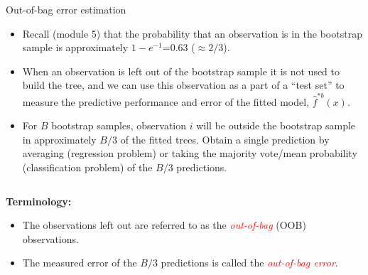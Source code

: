 \documentclass[
  10pt,
  ignorenonframetext,
]{beamer}
\providecommand{\tightlist}{%
  \setlength{\itemsep}{0pt}\setlength{\parskip}{0pt}}
\begin{document}
\begin{frame}
\begin{block}{Out-of-bag error estimation}
\protect\hypertarget{out-of-bag-error-estimation}{}
\(~\)

\begin{itemize}
\tightlist
\item
  Recall (module 5) that the probability that an observation is in the
  bootstrap sample is approximately \(1-e^{-1}\)=0.63 (\(\approx 2/3\)).
\end{itemize}

\vspace{1mm}

\begin{itemize}
\tightlist
\item
  When an observation is left out of the bootstrap sample it is not used
  to build the tree, and we can use this observation as a part of a
  ``test set'' to measure the predictive performance and error of the
  fitted model, \(\hat{f}^{*b}(x)\).
\end{itemize}

\vspace{1mm}

\begin{itemize}
\tightlist
\item
  For \(B\) bootstrap samples, observation \(i\) will be outside the
  bootstrap sample in approximately \(B/3\) of the fitted trees. Obtain
  a single prediction by averaging (regression problem) or taking the
  majority vote/mean probability (classification problem) of the \(B/3\)
  predictions.
\end{itemize}

\(~\)

\textbf{Terminology:}

\begin{itemize}
\item
  The observations left out are referred to as the
  \emph{\textcolor{red}{out-of-bag}} (OOB) observations.
\item
  The measured error of the \(B/3\) predictions is called the
  \emph{\textcolor{red}{out-of-bag error}}.
\end{itemize}
\end{block}
\end{frame}
\end{document}
